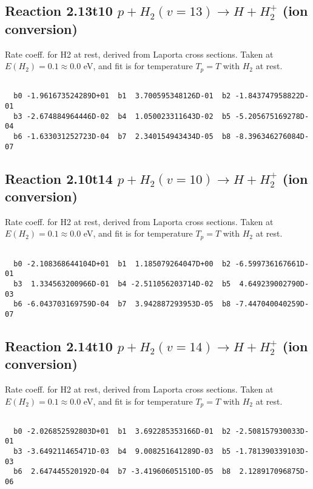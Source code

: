 \newpage
\subsection{
Reaction 2.13t10
$ p + H_2(v=13) \rightarrow H + H_2^+$ (ion conversion)
}
Rate coeff. for H2 at rest, derived from Laporta cross sections.
Taken at $E(H_2) = 0.1 \approx 0.0$ eV,  and fit is for temperature $T_p=T$ with $H_2$ at rest.

\begin{small}\begin{verbatim}

  b0 -1.961673524289D+01  b1  3.700595348126D-01  b2 -1.843747958822D-01
  b3 -2.674884964446D-02  b4  1.050023311643D-02  b5 -5.205675169278D-04
  b6 -1.633031252723D-04  b7  2.340154943434D-05  b8 -8.396346276084D-07

\end{verbatim}\end{small}

\newpage
\subsection{
Reaction 2.10t14
$ p + H_2(v=10) \rightarrow H + H_2^+$ (ion conversion)
}
Rate coeff. for H2 at rest, derived from Laporta cross sections.
Taken at $E(H_2) = 0.1 \approx 0.0$ eV,  and fit is for temperature $T_p=T$ with $H_2$ at rest.

\begin{small}\begin{verbatim}

  b0 -2.108368644104D+01  b1  1.185079264047D+00  b2 -6.599736167661D-01
  b3  1.334563200966D-01  b4 -2.511056203714D-02  b5  4.649239002790D-03
  b6 -6.043703169759D-04  b7  3.942887293953D-05  b8 -7.447040040259D-07

\end{verbatim}\end{small}

\newpage
\subsection{
Reaction 2.14t10
$ p + H_2(v=14) \rightarrow H + H_2^+$ (ion conversion)
}
Rate coeff. for H2 at rest, derived from Laporta cross sections.
Taken at $E(H_2) = 0.1 \approx 0.0$ eV,  and fit is for temperature $T_p=T$ with $H_2$ at rest.

\begin{small}\begin{verbatim}

  b0 -2.026852592803D+01  b1  3.692285353166D-01  b2 -2.508157930033D-01
  b3 -3.649211465471D-03  b4  9.008251641289D-03  b5 -1.781390339103D-03
  b6  2.647445520192D-04  b7 -3.419606051510D-05  b8  2.128917096875D-06

\end{verbatim}\end{small}

